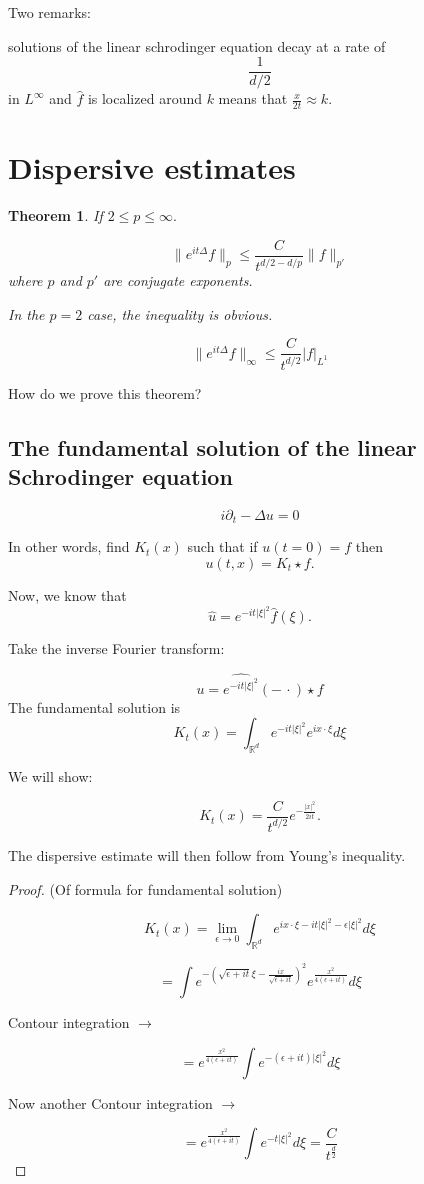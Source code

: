 \documentclass[11pt]{amsart}
\theoremstyle{plain}
\numberwithin{equation}{section}
\newtheorem{thm}{Theorem}[section]
\theoremstyle{remark}
\newcommand{\R}{\mathbb{R}}
\begin{document}
Two remarks:

solutions of the linear schrodinger equation decay at a rate of $$\frac{1}{d/2}$$ in $L^\infty$ and $\hat{f}$ is localized around $k$ means that $\frac{x}{2t} \approx k.$

\section{Dispersive estimates}

\begin{thm}
If $2\leq p \leq \infty.$

$$\| e^{it\Delta} f \|_p \leq \frac{C}{t^{d/2-d/p}} \| f\|_{p'}$$ where $p$ and $p'$ are conjugate exponents. 

In the $p=2$ case, the inequality is obvious. 

$$\| e^{it \Delta} f\|_{\infty} \leq \frac{C}{t^{d/2}} |f|_{L^1}$$

\end{thm}

How do we prove this theorem?

\subsection{The fundamental solution of the linear Schrodinger equation}

$$i\partial_{t} - \Delta u=0$$ 

In other words, find $K_{t}(x)$ such that if $u(t=0)=f$ then $$u(t,x)=K_{t} \star f.$$

Now, we know that $$\hat{u} =e^{-it|\xi|^2} \hat{f} (\xi).$$

Take the inverse Fourier transform:

$$u =  \hat{e^{-it|\xi|^2}} (- \, \cdot) \star f$$
The fundamental solution is $$K_{t}(x)=\int_{\R^d} e^{-it|\xi|^2}e^{ix\cdot\xi}d\xi$$

We will show:

$$K_{t}(x)= \frac{C}{t^{d/2}}e^{-\frac{|x|^2}{2it}}.$$ 

The dispersive estimate will then follow from Young's inequality.

\begin{proof} (Of formula for fundamental solution)

$$K_{t}(x) = \lim_{\epsilon\rightarrow 0} \int_{\R^d} e^{ix\cdot\xi -it|\xi|^2 -\epsilon |\xi|^2} d\xi$$

$$= \int e^{- (\sqrt{\epsilon+it}\xi -\frac{ix}{\sqrt{\epsilon +it}})^2} e^{\frac{x^2}{4(\epsilon+it)}} d\xi$$

Contour integration $\rightarrow$

$$=e^{\frac{x^2}{4(\epsilon+it)}}\int e^{-(\epsilon+it)|\xi|^2} d\xi $$

Now another Contour integration $\rightarrow$

$$= e^{\frac{x^2}{4(\epsilon+it)}}\int e^{-t|\xi|^2}d\xi =\frac{C}{t^{\frac{d}{2}}} $$



\end{proof}
\end{document}
